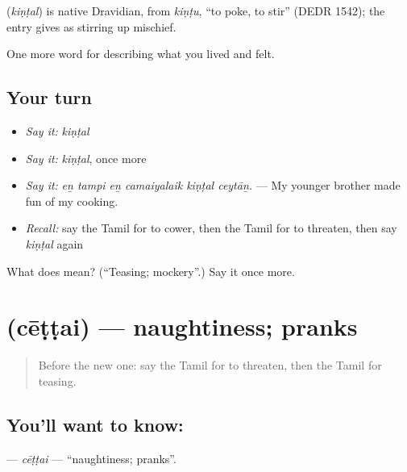 \begin{cousinweb}
\textbf{} (\emph{kiṇṭal}) is native Dravidian, from  \emph{kiṇṭu}, \textquotedblleft{}to poke, to stir\textquotedblright{} (DEDR 1542); the entry gives  as stirring up mischief.
\end{cousinweb}

\begin{grammarlens}[title={What you've built}]
One more word for describing what you lived and felt.
\end{grammarlens}

\subsection*{Your turn}
\begin{itemize}
\raggedright
  \item \emph{Say it:} \emph{kiṇṭal}
  \item \emph{Say it:} \emph{kiṇṭal}, once more
  \item \emph{Say it:} \emph{eṉ tampi eṉ camaiyalaik kiṇṭal ceytāṉ.} — My younger brother made fun of my cooking.
  \item \emph{Recall:} say the Tamil for to cower, then the Tamil for to threaten, then say \emph{kiṇṭal} again
\end{itemize}

\begin{tcolorbox}[breakable,colback=teal!4,colframe=teal!35!black,title={Before you move on}]
What does  mean? (\textquotedblleft{}Teasing; mockery\textquotedblright{}.) Say it once more.
\end{tcolorbox}
\section[\texorpdfstring{\ta{சேட்டை} (cēṭṭai)}{சேட்டை (cēṭṭai)}]{ (cēṭṭai) — naughtiness; pranks}

\label{lesson:TA-C467-cettai}



\begin{quote}
Before the new one: say the Tamil for to threaten, then the Tamil for teasing.
\end{quote}

\subsection*{You'll want to know: }
\textbf{} — \emph{cēṭṭai} — \textquotedblleft{}naughtiness; pranks\textquotedblright{}.

